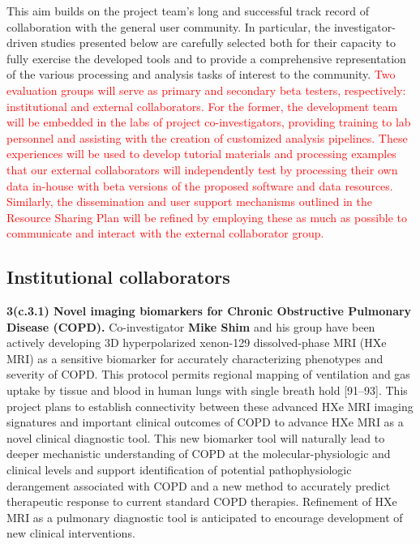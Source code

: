\documentclass[11pt,]{article}
\begin{document}
This aim builds on the project team's long and successful track record
of collaboration with the general user community. In particular, the
investigator-driven studies presented below are carefully selected both
for their capacity to fully exercise the developed tools and to provide
a comprehensive representation of the various processing and analysis
tasks of interest to the community.
\textcolor{red}{Two evaluation groups will serve as primary and secondary beta testers, respectively:
institutional and external collaborators.  For the former, the development team will be embedded in
the labs of project co-investigators, providing training to lab personnel and assisting with the
creation of customized analysis pipelines.  These experiences will be used to develop tutorial
materials and processing examples that our external collaborators will independently test by
processing their own data in-house with beta versions of the proposed software and data resources.
Similarly, the dissemination and user support mechanisms outlined in the Resource Sharing Plan will
be refined by employing these as much as possible to communicate and interact with the external
collaborator group.}

\subsection{Institutional
collaborators}\label{institutional-collaborators}

\textbf{3(c.3.1) Novel imaging biomarkers for Chronic Obstructive
Pulmonary Disease (COPD).} Co-investigator \textbf{Mike Shim} and his
group have been actively developing 3D hyperpolarized xenon-129
dissolved-phase MRI (HXe MRI) as a sensitive biomarker for accurately
characterizing phenotypes and severity of COPD. This protocol permits
regional mapping of ventilation and gas uptake by tissue and blood in
human lungs with single breath hold {[}91--93{]}. This project plans to
establish connectivity between these advanced HXe MRI imaging signatures
and important clinical outcomes of COPD to advance HXe MRI as a novel
clinical diagnostic tool. This new biomarker tool will naturally lead to
deeper mechanistic understanding of COPD at the molecular-physiologic
and clinical levels and support identification of potential
pathophysiologic derangement associated with COPD and a new method to
accurately predict therapeutic response to current standard COPD
therapies. Refinement of HXe MRI as a pulmonary diagnostic tool is
anticipated to encourage development of new clinical interventions.
\end{document}
